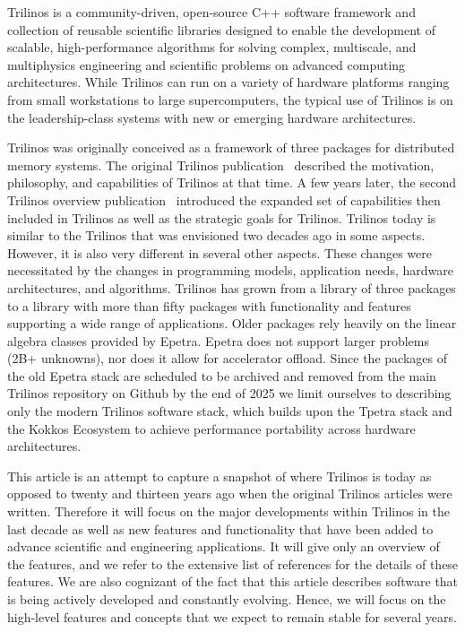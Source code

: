 
Trilinos is a community-driven, open-source C++ software framework and collection of reusable scientific libraries designed to enable the development of scalable, high-performance algorithms for solving complex, multiscale, and multiphysics engineering and scientific problems on advanced computing architectures.
While Trilinos can run on a variety of hardware platforms ranging from small workstations to large supercomputers, the typical use of Trilinos is on the leadership-class systems with new or emerging hardware architectures.

Trilinos was originally conceived as a framework of three packages for distributed memory systems. The original Trilinos publication~\cite{Heroux2005a} described the motivation, philosophy, and capabilities of Trilinos at that time. A few years later, the second Trilinos overview publication~\cite{Heroux2012} introduced the expanded set of capabilities then included in Trilinos as well as the strategic goals for Trilinos. Trilinos today is similar to the Trilinos that was envisioned two decades ago in some aspects. However, it is also very different in several other aspects. These changes were necessitated by the changes in programming models, application needs, hardware architectures, and algorithms. Trilinos has grown from a library of three packages to a library with more than fifty packages with functionality and features supporting a wide range of applications.
Older packages rely heavily on the linear algebra classes provided by Epetra.
Epetra does not support larger problems (2B+ unknowns), nor does it allow for accelerator offload.
Since the packages of the old Epetra stack are scheduled to be archived and removed from the main Trilinos repository on Github by the end of 2025 we limit ourselves to describing only the modern Trilinos software stack, which builds upon the Tpetra stack and the Kokkos Ecosystem to achieve performance portability across hardware architectures.

This article is an attempt to capture a snapshot of where Trilinos is today as opposed to twenty and thirteen years ago when the original Trilinos articles were written.
Therefore it will focus on the major developments within Trilinos in the last decade as well as new features and functionality that have been added to advance scientific and engineering applications.
It will give only an overview of the features, and we refer to the extensive list of references for the details of these features.
We are also cognizant of the fact that this article describes software that is being actively developed and constantly evolving.
Hence, we will focus on the high-level features and concepts that we expect to remain stable for several years.



